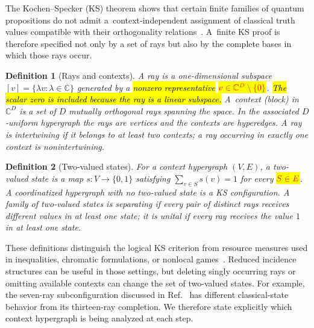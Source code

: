 \documentclass[%
  reprint,
  superscriptaddress,
  showpacs,
  showkeys,
  amsmath,amssymb,
  pra,
  longbibliography,
  floatfix,
  x11names
]{revtex4-2}
\newenvironment{revision}{\begingroup\color{revisionblue}}{\endgroup}
\newcommand{\corr}[1]{{\color{red}\hl{#1}}}
\newcommand{\corrmath}[1]{\begingroup\setlength{\fboxsep}{1pt}\colorbox{yellow}{\ensuremath{\color{red}#1}}\endgroup}
\newtheorem{definition}{Definition}
\begin{document}
\begin{revision}
The Kochen--Specker (KS) theorem shows that certain finite families of quantum propositions do not admit a~context-independent assignment of classical truth values compatible with their orthogonality relations~\cite{kochen1}.  A~finite KS proof is therefore specified not only by a set of rays but also by the complete bases in which those rays occur.

\begin{definition}[Rays and contexts]
\label{def:contexts}
A \emph{ray} is a one-dimensional subspace
$[v]=\{\lambda v:\lambda\in\mathbb{C}\}$ generated by a
\corr{nonzero representative} \corrmath{v\in\mathbb{C}^D\setminus\{0\}}.
\corr{The scalar zero is included because the ray is a linear subspace.}
A~\emph{context} (block) in $\mathbb{C}^D$ is a set of $D$ mutually orthogonal rays spanning the space.  In the associated $D$-uniform hypergraph the rays are vertices and the contexts are hyperedges.  A ray is \emph{intertwining} if it belongs to at least two contexts; a ray occurring in exactly one context is nonintertwining.
\end{definition}

\begin{definition}[Two-valued states]
\label{def:states}
For a context hypergraph $(V,E)$, a two-valued state is a map $s:V\to\{0,1\}$ satisfying $\sum_{v\in S}s(v)=1$ for every \corrmath{S\in E}.
A coordinatized hypergraph with no two-valued state is a KS configuration.  A family of two-valued states is \emph{separating} if every pair of distinct rays receives different values in at least one state; it is \emph{unital} if every ray receives the value $1$ in at least one state.
\end{definition}

These definitions distinguish the logical KS criterion from resource measures used in inequalities, chromatic formulations, or nonlocal games~\cite{cabello:210401,2024-cabello-trandafir0,svozil-2025-color}.  Reduced incidence structures can be useful in those settings, but deleting singly occurring rays or omitting available contexts can change the set of two-valued states.  For example, the seven-ray subconfiguration discussed in Ref.~\cite[Fig.~6(a)]{pavicic-2025} has different classical-state behavior from its thirteen-ray completion.  We therefore state explicitly which context hypergraph is being analyzed at each step.


\end{revision}
\end{document}

